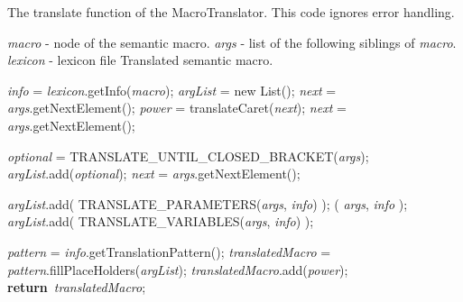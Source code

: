 \documentclass[a4paper,11pt]{article}
\renewcommand{\Return}{\textbf{return}}
\theoremstyle{defTheoStyle}
\theoremstyle{defExampStyle}
\begin{document}
\begin{algorithm}[!ht]
\caption{The translate function of the MacroTranslator. This code ignores error handling.}\label{alg:macro-translation}
	\begin{algorithmic}[1]
	\Require 
		\Statex \textit{macro} - node of the semantic macro. 
		\Statex \textit{args} - list of the following siblings of \textit{macro}. 
		\Statex \textit{lexicon} - lexicon file
	\Ensure 
		\Statex Translated semantic macro.
	
	\State \textit{info} = \textit{lexicon}.getInfo(\textit{macro});
	\State \textit{argList} = new List(); 
	\State \textit{next} = \textit{args}.getNextElement();
	\label{line:next_caret}
		\State \textit{power} = translateCaret(\textit{next});
		\State \textit{next} = \textit{args}.getNextElement();
	\EndIf
	
	\While{\textit{next} is $[$}\label{line:next_optional} 
		\State \textit{optional} = {\scriptsize TRANSLATE\_UNTIL\_CLOSED\_BRACKET}(\textit{args});
		\State \textit{argList}.add(\textit{optional});
		\State \textit{next} = \textit{args}.getNextElement();
	\EndWhile
	
	\State \textit{argList}.add( {\scriptsize TRANSLATE\_PARAMETERS}(\textit{args}, \textit{info}) ); \label{line:trans_paras} 
	( \textit{args}, \textit{info} );  \label{line:skip_ats} 
	\State \textit{argList}.add( {\scriptsize TRANSLATE\_VARIABLES}(\textit{args}, \textit{info}) ); \label{line:trans_vars} 
	
	\State \textit{pattern} = \textit{info}.getTranslationPattern();
	\State \textit{translatedMacro} = \textit{pattern}.fillPlaceHolders(\textit{argList});
		\State \textit{translatedMacro}.add(\textit{power});
	\EndIf
	\State \Return\ \textit{translatedMacro};
	\EndProcedure
	\end{algorithmic}
\end{algorithm}
\end{document}
